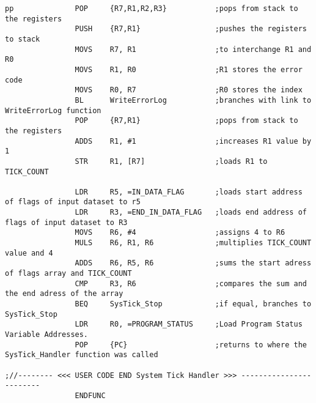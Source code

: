 \documentclass[pdftex,12pt,a4paper]{article}
\begin{document}
\begin{lstlisting}[caption=SysTick\_Handler Function, style=customasm]
pp				POP		{R7,R1,R2,R3}			;pops from stack to the registers
				PUSH	{R7,R1}					;pushes the registers to stack 
				MOVS	R7, R1					;to interchange R1 and R0
				MOVS	R1, R0					;R1 stores the error code
				MOVS	R0, R7					;R0 stores the index
				BL		WriteErrorLog			;branches with link to WriteErrorLog function
				POP		{R7,R1}					;pops from stack to the registers
				ADDS	R1, #1					;increases R1 value by 1
				STR		R1, [R7]				;loads R1 to TICK_COUNT
				
				LDR		R5, =IN_DATA_FLAG		;loads start address of flags of input dataset to r5
				LDR		R3, =END_IN_DATA_FLAG 	;loads end address of flags of input dataset to R3
				MOVS	R6, #4					;assigns 4 to R6
				MULS	R6, R1, R6				;multiplies TICK_COUNT value and 4
				ADDS	R6, R5, R6				;sums the start adress of flags array and TICK_COUNT		
				CMP		R3, R6					;compares the sum and the end adress of the array
				BEQ		SysTick_Stop			;if equal, branches to SysTick_Stop		
				LDR 	R0, =PROGRAM_STATUS		;Load Program Status Variable Addresses.
				POP		{PC}					;returns to where the SysTick_Handler function was called				
				
;//-------- <<< USER CODE END System Tick Handler >>> ------------------------				
				ENDFUNC
\end{lstlisting}
\end{document}
